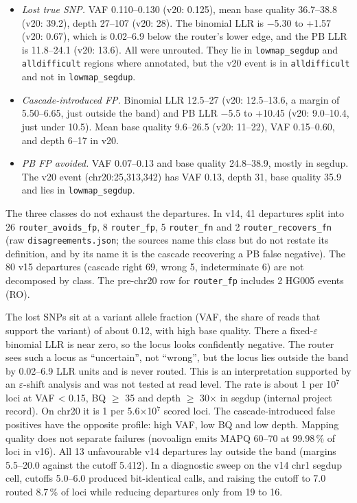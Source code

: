 \documentclass[11pt,a4paper]{article}
\begin{document}
\begin{itemize}[leftmargin=1.6em,itemsep=2pt,topsep=3pt]
\item \emph{Lost true SNP.} VAF 0.110--0.130 (v20: 0.125), mean base quality 36.7--38.8 (v20: 39.2), depth 27--107 (v20: 28). The binomial LLR is $-$5.30 to +1.57 (v20: 0.67), which is 0.02--6.9 below the router's lower edge, and the PB LLR is 11.8--24.1 (v20: 13.6). All were unrouted. They lie in \texttt{lowmap\_\allowbreak{}segdup} and \texttt{alldifficult} regions where annotated, but the v20 event is in \texttt{alldifficult} and not in \texttt{lowmap\_\allowbreak{}segdup}.
\item \emph{Cascade-introduced FP.} Binomial LLR 12.5--27 (v20: 12.5--13.6, a margin of 5.50--6.65, just outside the band) and PB LLR $-$5.5 to +10.45 (v20: 9.0--10.4, just under 10.5). Mean base quality 9.6--26.5 (v20: 11--22), VAF 0.15--0.60, and depth 6--17 in v20.
\item \emph{PB FP avoided.} VAF 0.07--0.13 and base quality 24.8--38.9, mostly in segdup. The v20 event (chr20:25,313,342) has VAF 0.13, depth 31, base quality 35.9 and lies in \texttt{lowmap\_\allowbreak{}segdup}.
\end{itemize}
The three classes do not exhaust the departures. In v14, 41 departures split into 26 \texttt{router\_\allowbreak{}avoids\_\allowbreak{}fp}, 8 \texttt{router\_\allowbreak{}fp}, 5 \texttt{router\_\allowbreak{}fn} and 2 \texttt{router\_\allowbreak{}recovers\_\allowbreak{}fn} (raw \texttt{disagreements.\allowbreak{}json}; the sources name this class but do not restate its definition, and by its name it is the cascade recovering a PB false negative). The 80 v15 departures (cascade right 69, wrong 5, indeterminate 6) are not decomposed by class. The pre-chr20 row for \texttt{router\_\allowbreak{}fp} includes 2 HG005 events (RO).

The lost SNPs sit at a variant allele fraction (VAF, the share of reads that support the variant) of about 0.12, with high base quality. There a fixed-$\varepsilon$ binomial LLR is near zero, so the locus looks confidently negative. The router sees such a locus as ``uncertain'', not ``wrong'', but the locus lies outside the band by 0.02--6.9 LLR units and is never routed. This is an interpretation supported by an $\varepsilon$-shift analysis and was not tested at read level. The rate is about 1 per 10$^{7}$ loci at VAF < 0.15, BQ $\ge$ 35 and depth $\ge$ 30$\times$ in segdup (internal project record). On chr20 it is 1 per 5.6$\times$10$^{7}$ scored loci. The cascade-introduced false positives have the opposite profile: high VAF, low BQ and low depth. Mapping quality does not separate failures (novoalign emits MAPQ 60--70 at 99.98\,\% of loci in v16). All 13 unfavourable v14 departures lay outside the band (margins 5.5--20.0 against the cutoff 5.412). In a diagnostic sweep on the v14 chr1 segdup cell, cutoffs 5.0--6.0 produced bit-identical calls, and raising the cutoff to 7.0 routed 8.7\,\% of loci while reducing departures only from 19 to 16.
\end{document}
